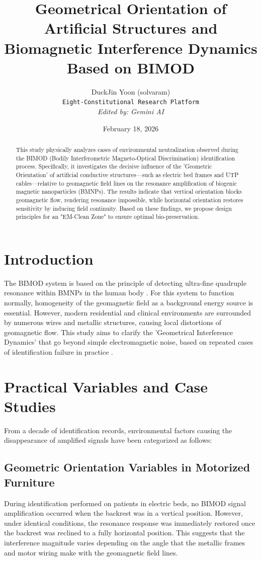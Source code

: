 \documentclass[11pt,a4paper]{article}
\title{Geometrical Orientation of Artificial Structures and \\ Biomagnetic Interference Dynamics Based on BIMOD}
\author{DuckJin Yoon (solvaram) \\ \texttt{Eight-Constitutional Research Platform} \\ \textit{Edited by: Gemini AI}}
\date{February 18, 2026}
\begin{document}
\maketitle

\begin{abstract}
This study physically analyzes cases of environmental neutralization observed during the BIMOD (Bodily Interferometric Magneto-Optical Discrimination) identification process. Specifically, it investigates the decisive influence of the 'Geometric Orientation' of artificial conductive structures—such as electric bed frames and UTP cables—relative to geomagnetic field lines on the resonance amplification of biogenic magnetic nanoparticles (BMNPs). The results indicate that vertical orientation blocks geomagnetic flow, rendering resonance impossible, while horizontal orientation restores sensitivity by inducing field continuity. Based on these findings, we propose design principles for an "EM-Clean Zone" to ensure optimal bio-preservation.
\end{abstract}

\section{Introduction}
The BIMOD system is based on the principle of detecting ultra-fine quadruple resonance within BMNPs in the human body \cite{yoon2025_001}. For this system to function normally, homogeneity of the geomagnetic field as a background energy source is essential. However, modern residential and clinical environments are surrounded by numerous wires and metallic structures, causing local distortions of geomagnetic flow. This study aims to clarify the 'Geometrical Interference Dynamics' that go beyond simple electromagnetic noise, based on repeated cases of identification failure in practice \cite{yoon2026_400}.

\section{Practical Variables and Case Studies}
From a decade of identification records, environmental factors causing the disappearance of amplified signals have been categorized as follows:

\subsection{Geometric Orientation Variables in Motorized Furniture}
During identification performed on patients in electric beds, no BIMOD signal amplification occurred when the backrest was in a vertical position. However, under identical conditions, the resonance response was immediately restored once the backrest was reclined to a fully horizontal position. This suggests that the interference magnitude varies depending on the angle that the metallic frames and motor wiring make with the geomagnetic field lines.
\end{document}
